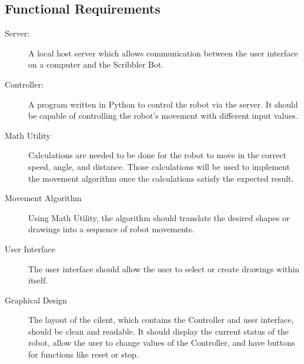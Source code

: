 \documentclass[11pt, letterpaper]{article}
\begin{document}
		\subsection{Functional Requirements}
		\begin{description}
			\item[Server:]
				A local host server which allows communication between the user interface on a computer and the Scribbler Bot.
			\item[Controller:]
				A program written in Python to control the robot via the server. It should be capable of controlling the robot's movement with different input values.
			\item[Math Utility]
				Calculations are needed to be done for the robot to move in the correct speed, angle, and distance. Those calculations will be used to implement the movement algorithm once the calculations satisfy the expected result.
			\item[Movement Algorithm]
				Using Math Utility, the algorithm should translate the desired shapes or drawings into a sequence of robot movements.
			\item[User Interface]
				The user interface should allow the user to select or create drawings within itself.
			\item[Graphical Design]
				The layout of the cilent, which contains the Controller and user interface, should be clean and readable. It should display the current status of the robot, allow the user to change values of the Controller, and have buttons for functions like reset or stop. 
		\end{description}
\end{document}
